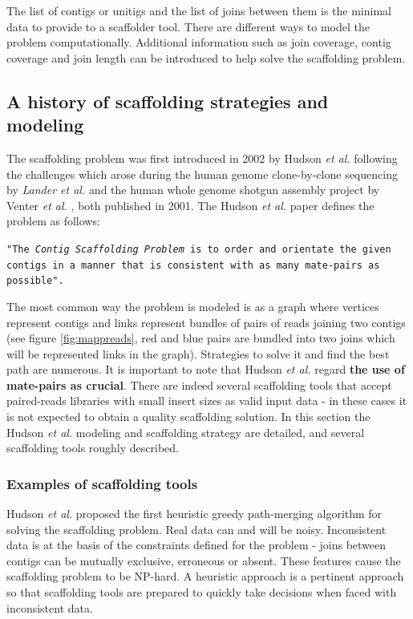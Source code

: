 \documentclass[12pt]{article}
\begin{document}
The list of contigs or unitigs and the list of joins between them is the minimal data to provide to a scaffolder tool. There are different ways to model the problem computationally. Additional information such as join coverage, contig coverage and join length can be introduced to help solve the scaffolding problem. 

\newpage
\subsection{A history of scaffolding strategies and modeling}\label{sec:hiscaf}
The scaffolding problem was first introduced in 2002 by Hudson \textit{et al.} \cite{huson_greedy_2002} following the challenges which arose during the human genome clone-by-clone sequencing by \textit{Lander et al.} \cite{lander_initial_2001} and the human whole genome shotgun  assembly project by Venter \textit{et al.} \cite{venter_sequence_2001-1}, both published in 2001. The Hudson \textit{et al.} paper defines the problem as follows: \begin{displayquote} \footnotesize \texttt{"The \textit{Contig Scaffolding Problem}  is to order and orientate the given contigs in a manner that is consistent with as many mate-pairs as possible".}\end{displayquote} The most common way the problem is modeled is as a graph where vertices represent contigs and links represent bundles of pairs of reads joining two contigs (see figure \ref{fig:mappreads}, red and blue pairs are bundled into two joins which will be represented links in the graph). Strategies to solve it and find the best path are numerous. It is important to note that Hudson \textit{et al.} regard \textbf{the use of mate-pairs as crucial}. There are indeed several scaffolding tools that accept paired-reads libraries with small insert sizes as valid input data - in these cases it is not expected to obtain a quality scaffolding solution. In this section the Hudson \textit{et al.} \cite{huson_greedy_2002} modeling and scaffolding strategy are detailed, and several scaffolding tools roughly described. 

\subsubsection{Examples of scaffolding tools}
Hudson \textit{et al.} proposed the first heuristic greedy path-merging algorithm for solving the scaffolding problem. Real data can and will be noisy. Inconsistent data is at the basis of the constraints defined for the problem - joins between contigs can be mutually exclusive, erroneous or absent. These features cause the scaffolding problem to be NP-hard. A heuristic approach is a pertinent approach so that scaffolding tools are prepared to quickly take decisions when faced with inconsistent data. 
\end{document}
